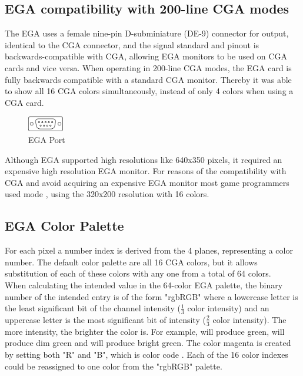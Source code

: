 \documentclass[book.tex]{subfiles}
\begin{document}
 
\subsection{EGA compatibility with 200-line CGA modes}
The EGA uses a female nine-pin D-subminiature (DE-9) connector for output, identical to the CGA connector, and the signal standard and pinout is backwards-compatible with CGA, allowing EGA monitors to be used on CGA cards and vice versa. When operating in 200-line CGA modes, the EGA card is fully backwards compatible with a standard CGA monitor. Thereby it was able to show all 16 CGA colors simultaneously, instead of only 4 colors when using a CGA card.\\

 \begin{figure}[H]
\centering
\includegraphics[width=0.14\textwidth]{imgs/drawings/ports/DE9_serial_port.eps}
\caption{EGA Port}
\label{fig:egaPort}
\end{figure}

Although EGA supported high resolutions like 640x350 pixels, it required an expensive high resolution EGA monitor. For reasons of the compatibility with CGA and avoid acquiring an expensive EGA monitor most game programmers used  mode , using the 320x200 resolution with 16 colors.


  
\subsection{EGA Color Palette}
\label{sec:ega_color_palette}
For each pixel a number index is derived from the 4 planes, representing a color number. The default color palette are all 16 CGA colors, but it allows substitution of each of these colors with any one from a total of 64 colors.\\

When calculating the intended value in the 64-color EGA palette, the binary number of the intended entry is of the form "rgbRGB" where a lowercase letter is the least significant bit of the channel intensity (\(\frac{1}{3}\) color intensity) and an uppercase letter is the most significant bit of intensity (\(\frac{2}{3}\) color intensity). The more intensity, the brighter the color is. For example,  will produce green,  will produce dim green and  will produce bright green. The color magenta is created by setting both "R" and "B", which is color code . Each of the 16 color indexes could be reassigned to one color from the "rgbRGB" palette.\\
\end{document}

